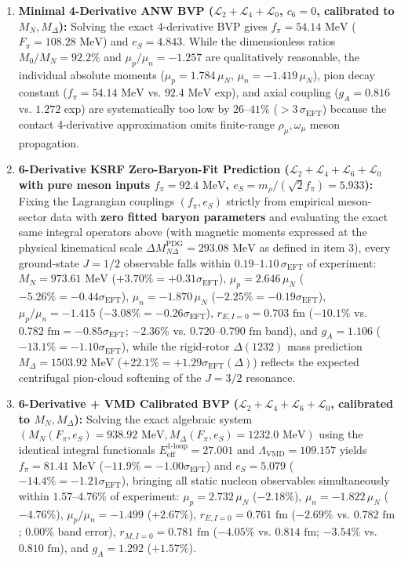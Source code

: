 \documentclass[10pt,aps,prd,twocolumn,superscriptaddress,nofootinbib,floatfix,longbibliography,showkeys]{revtex4-2}
\begin{document}
\begin{enumerate}
  \item \textbf{Minimal 4-Derivative ANW BVP ($\mathcal{L}_2+\mathcal{L}_4+\mathcal{L}_0$, $c_6 = 0$, calibrated to $M_N, M_\Delta$):} Solving the exact 4-derivative BVP gives $f_\pi = 54.14\text{ MeV}$ ($F_\pi = 108.28\text{ MeV}$) and $e_S = 4.843$. While the dimensionless ratios $M_0/M_N = 92.2\%$ and $\mu_p/\mu_n = -1.257$ are qualitatively reasonable, the individual absolute moments ($\mu_p = 1.784\,\mu_N$, $\mu_n = -1.419\,\mu_N$), pion decay constant ($f_\pi = 54.14\text{ MeV}$ vs. $92.4\text{ MeV}$ exp), and axial coupling ($g_A = 0.816$ vs. $1.272$ exp) are systematically too low by $26\text{--}41\%$ ($> 3\,\sigma_{\text{EFT}}$) because the contact 4-derivative approximation omits finite-range $\rho_\mu, \omega_\mu$ meson propagation.
  \item \textbf{6-Derivative KSRF Zero-Baryon-Fit Prediction ($\mathcal{L}_2+\mathcal{L}_4+\mathcal{L}_6+\mathcal{L}_0$ with pure meson inputs $f_\pi = 92.4\text{ MeV}$, $e_S = m_\rho/(\sqrt{2}f_\pi) = 5.933$):} Fixing the Lagrangian couplings $(f_\pi, e_S)$ strictly from empirical meson-sector data with \textbf{zero fitted baryon parameters} and evaluating the exact same integral operators above (with magnetic moments expressed at the physical kinematical scale $\Delta M_{N\Delta}^{\text{PDG}} = 293.08\text{ MeV}$ as defined in item 3), every ground-state $J=1/2$ observable falls within \textbf{$0.19\text{--}1.10\,\sigma_{\text{EFT}}$} of experiment: $M_N = 973.61\text{ MeV}$ ($+3.70\% = +0.31\sigma_{\text{EFT}}$), $\mu_p = 2.646\,\mu_N$ ($-5.26\% = -0.44\sigma_{\text{EFT}}$), $\mu_n = -1.870\,\mu_N$ ($-2.25\% = -0.19\sigma_{\text{EFT}}$), $\mu_p/\mu_n = -1.415$ ($-3.08\% = -0.26\sigma_{\text{EFT}}$), $r_{E,I=0} = 0.703\text{ fm}$ ($-10.1\%$ vs. $0.782\text{ fm} = -0.85\sigma_{\text{EFT}}$; $-2.36\%$ vs. $0.720\text{--}0.790\text{ fm}$ band), and $g_A = 1.106$ ($-13.1\% = -1.10\sigma_{\text{EFT}}$), while the rigid-rotor $\Delta(1232)$ mass prediction $M_\Delta = 1503.92\text{ MeV}$ ($+22.1\% = +1.29\sigma_{\text{EFT}}(\Delta)$) reflects the expected centrifugal pion-cloud softening of the $J=3/2$ resonance.
  \item \textbf{6-Derivative + VMD Calibrated BVP ($\mathcal{L}_2+\mathcal{L}_4+\mathcal{L}_6+\mathcal{L}_0$, calibrated to $M_N, M_\Delta$):} Solving the exact algebraic system $(M_N(F_\pi, e_S) = 938.92\text{ MeV}, M_\Delta(F_\pi, e_S) = 1232.0\text{ MeV})$ using the identical integral functionals $E_{\text{eff}}^{\text{1-loop}} = 27.001$ and $\Lambda_{\text{VMD}} = 109.157$ yields $f_\pi = 81.41\text{ MeV}$ ($-11.9\% = -1.00\sigma_{\text{EFT}}$) and $e_S = 5.079$ ($-14.4\% = -1.21\sigma_{\text{EFT}}$), bringing all static nucleon observables simultaneously within $1.57\text{--}4.76\%$ of experiment: $\mu_p = 2.732\,\mu_N$ ($-2.18\%$), $\mu_n = -1.822\,\mu_N$ ($-4.76\%$), $\mu_p/\mu_n = -1.499$ ($+2.67\%$), $r_{E,I=0} = 0.761\text{ fm}$ ($-2.69\%$ vs. $0.782\text{ fm}$; $0.00\%$ band error), $r_{M,I=0} = 0.781\text{ fm}$ ($-4.05\%$ vs. $0.814\text{ fm}$; $-3.54\%$ vs. $0.810\text{ fm}$), and $g_A = 1.292$ ($+1.57\%$).

\end{enumerate}
\end{document}

